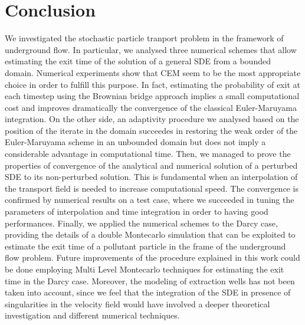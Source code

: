 \section{Conclusion}

We investigated the stochastic particle tranport problem in the framework of underground flow. In particular, we analysed three numerical schemes that allow estimating the exit time of the solution of a general SDE from a bounded domain. Numerical experiments show that CEM seem to be the most appropriate choice in order to fulfill this purpose. In fact, estimating the probability of exit at each timestep using the Brownian bridge approach implies a small computational cost and improves dramatically the convergence of the classical Euler-Maruyama integration. On the other side, an adaptivity procedure we analysed based on the position of the iterate in the domain succeedes in restoring the weak order of the Euler-Maruyama scheme in an unbounded domain but does not imply a considerable advantage in computational time. Then, we managed to prove the properties of convergence of the analytical and numerical solution of a perturbed SDE to its non-perturbed solution. This is fundamental when an interpolation of the transport field is needed to increase computational speed. The convergence is confirmed by numerical results on a test case, where we succeeded in tuning the parameters of interpolation and time integration in order to having good performances. Finally, we applied the numerical schemes to the Darcy case, providing the details of a double Montecarlo simulation that can be exploited to estimate the exit time of a pollutant particle in the frame of the underground flow problem. Future improvements of the procedure explained in this work could be done employing Multi Level Montecarlo techniques for estimating the exit time in the Darcy case. Moreover, the modeling of extraction wells has not been taken into account, since we feel that the integration of the SDE in presence of singularities in the velocity field would have involved a deeper theoretical investigation and different numerical techniques.  
